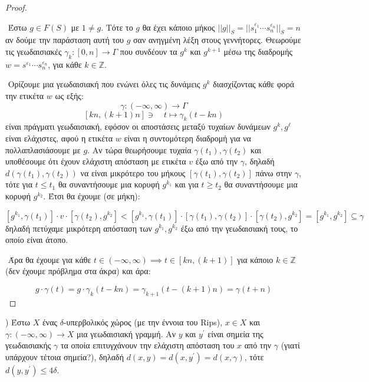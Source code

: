 \documentclass[oneside,a4paper]{article}
\newcommand {\tl}{\textlatin}
\newcommand{\Z}{\mathbb{Z}}
\begin{document}
\begin{proof} $ $

	$ $\newline
	Έστω $g \in F(S)$ με $1\neq g$. Τότε το $g$ θα έχει κάποιο μήκος $||g||_S = ||s^{\varepsilon_1}_1 \cdots s^{\varepsilon_n}_n||_S = n$ αν δούμε την παράσταση αυτή του $g$ σαν ανηγμένη λέξη στους γεννήτορες. Θεωρούμε τις γεωδαισιακές $\gamma_{k}:[0,n] \rightarrow \Gamma$ που συνδέουν τα $g^k$ και $g^{k+1}$ μέσω της διαδρομής $w = s^{\varepsilon_1} \cdots s^{\varepsilon_n}_n$, για κάθε $k \in \Z$.


	$ $\newline
	Ορίζουμε μια γεωδαισιακή που ενώνει όλες τις δυνάμεις $g^k$ διασχίζοντας κάθε φορά την ετικέτα $w$ ως εξής:
	$$\gamma : (-\infty, \infty) \longrightarrow \Gamma $$
	$$   [kn, (k+1)n]\ni \quad  t \longmapsto \gamma_k (t - kn)$$ είναι πράγματι γεωδαισιακή, εφόσον οι αποστάσεις μεταξύ τυχαίων δυνάμεων $g^{k},g^{\ell}$ είναι ελάχιστες, αφού η ετικέτα $w$ είναι η συντομότερη διαδρομή για να πολλαπλασιάσουμε με $g$. Αν τώρα θεωρήσουμε τυχαία $\gamma(t_1),\gamma(t_2)$ και υποθέσουμε ότι έχουν ελάχιστη απόσταση με ετικέτα $v$ έξω από την $\gamma$, δηλαδή $d(\gamma(t_1),\gamma(t_2))$ να είναι μικρότερο του μήκους $[\gamma(t_1),\gamma(t_2)]$ πάνω στην $\gamma$, τότε για $t \leq t_1$ θα συναντήσουμε μια κορυφή $g^{k_1}$ και για $t\geq t_2$ θα συναντήσουμε μια κορυφή $g^{k_2}$. Έτσι θα έχουμε (σε μήκη):

	$$[g^{k_1},\gamma(t_1)] \cdot v \cdot [\gamma(t_2), g^{k_2}] < [g^{k_1},\gamma(t_1)] \cdot [\gamma(t_1),\gamma(t_2)] \cdot [\gamma(t_2), g^{k_2}] = [g^{k_1},g^{k_2}] \subseteq \gamma$$ δηλαδή πετύχαμε μικρότερη απόσταση των $g^{k_1},g^{k_2}$ έξω από την γεωδαισιακή τους, το οποίο είναι άτοπο.														
	
	
	$ $\newline
	Άρα θα έχουμε για κάθε $ t \in (-\infty,\infty) \implies t \in [kn,(k+1)]$ για κάποιο $k \in \mathbb{Z}$ (δεν έχουμε πρόβλημα στα άκρα) και άρα:

	$$ g \cdot \gamma(t) = g \cdot \gamma_k (t - kn) = \gamma_{k+1} ( t - (k+1)n) = \gamma(t+n)$$
\end{proof}



\pagebreak

) Έστω $X$ ένας $\delta$-υπερβολικός χώρος (με την έννοια του \tl{Rips}), $x \in X$ και $\gamma: (-\infty, \infty) \rightarrow X$ μια γεωδαισιακή γραμμή. Αν $y$ και $y^{\prime}$ είναι σημεία της γεωδαισιακής $\gamma$ τα οποία επιτυγχάνουν την ελάχιστη απόσταση του $x$ από την $\gamma$ (γιατί υπάρχουν τέτοια σημεία?), δηλαδή $d(x,y) = d(x,y^{\prime}) = d(x,\gamma)$, τότε $d(y,y^{\prime})\leq 4\delta$.
\end{document}
